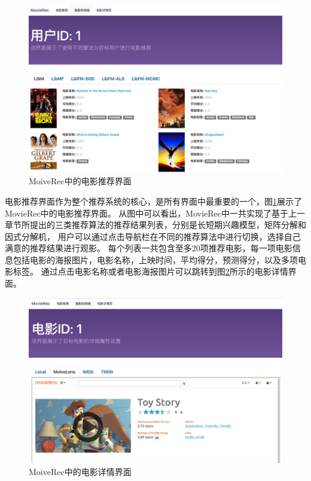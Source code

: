 \begin{figure}[htbp]
\centering
\includegraphics[scale=0.17]{images/systemshow1.jpeg}
\caption{MoiveRec中的电影推荐界面}
\label{fig:systemshow1}
\end{figure}

电影推荐界面作为整个推荐系统的核心，是所有界面中最重要的一个，图\ref{fig:systemshow1}展示了MovieRec中的电影推荐界面。
从图中可以看出，MovieRec中一共实现了基于上一章节所提出的三类推荐算法的推荐结果列表，分别是长短期兴趣模型，矩阵分解和因式分解机，
用户可以通过点击导航栏在不同的推荐算法中进行切换，选择自己满意的推荐结果进行观影。
每个列表一共包含至多20项推荐电影，每一项电影信息包括电影的海报图片，电影名称，上映时间，平均得分，预测得分，以及多项电影标签。
通过点击电影名称或者电影海报图片可以跳转到图\ref{fig:systemshow2}所示的电影详情界面。

\begin{figure}[htbp]
\centering
\includegraphics[scale=0.2]{images/systemshow2.jpeg}
\caption{MoiveRec中的电影详情界面}
\label{fig:systemshow2}
\end{figure}


